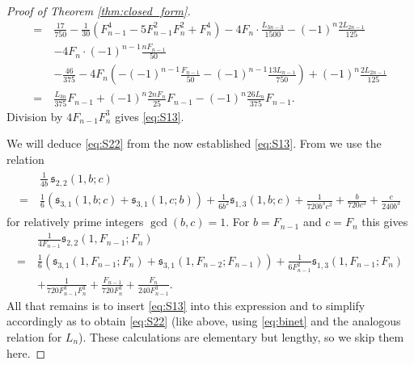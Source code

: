 \documentclass[]{interact}
\newcommand{\frs}{\mathfrak{s}}
\theoremstyle{definition}
\numberwithin{table}{section} %
\numberwithin{figure}{section}
\begin{document}
\begin{proof} [Proof of Theorem \ref{thm:closed_form}]
\begin{align*}
        = ~& \frac{17}{750} - \frac1{30} \left(F_{n-1}^4 - 5 F_{n-1}^2 F_n^2 + F_n^4\right) - 4 F_n \cdot \frac{L_{3n-3}}{1500} - (-1)^n \frac{2 L_{2n-1}}{125} \\
        & - 4 F_n \cdot (-1)^{n-1} \frac{n F_{n-1}}{50} \\
        & -\frac{46}{375} -4F_n \left(-(-1)^{n-1} \frac{F_{n-1}}{50} - (-1)^{n-1} \frac{13 L_{n-1}}{750}\right) + (-1)^n \frac{2 L_{2n-1}}{125} \\
        = ~& \frac{L_{3n}}{375} F_{n-1} + (-1)^n\frac{2n F_n}{25} F_{n-1} - (-1)^n \frac{26L_n }{375} F_{n-1}.
    \end{align*}
    Division by $4 F_{n-1} F_n^3$ gives \eqref{eq:S13}.

    We will deduce \eqref{eq:S22} from the now established \eqref{eq:S13}. %
    From \cite{HWZ95} we use the relation
    \begin{align*} %
        \begin{split}
            & \frac1{4b} \, \frs^{}_{2,2}(1, b; c) \\
        = ~ & \frac16\left(\frs^{}_{3, 1}(1, b; c) + \frs^{}_{3, 1}(1, c; b)\right) + \frac1{6b^2} \frs^{}_{1,3}(1, b; c) + \frac1{720 b^3 c^3} + \frac b{720 c^3} + \frac c{240 b^3}
        \end{split}
    \end{align*}
    for relatively prime integers $\gcd(b, c) = 1$. For $b=F_{n-1}$ and $c=F_n$ this gives
    \begin{align*}
        & \frac1{4F_{n-1}} \frs^{}_{2,2}(1, F_{n-1}; F_n) \\
        = ~ & \frac16\left(\frs^{}_{3, 1}(1, F_{n-1}; F_n) + \frs^{}_{3, 1}(1, F_{n-2}; F_{n-1})\right) + \frac1{6F_{n-1}^2} \frs^{}_{1,3}(1, F_{n-1}; F_n) \\
        & + \frac1{720 F_{n-1}^3 F_n^3} + \frac {F_{n-1}}{720 F_n^3} + \frac {F_n}{240 F_{n-1}^3}.
    \end{align*}
    All that remains is to insert \eqref{eq:S13} into this expression and to simplify accordingly as to obtain \eqref{eq:S22} (like above, using \eqref{eq:binet} and the analogous relation for $L_n$). These calculations are elementary but lengthy, so we skip them here.
\end{proof}
\end{document}
